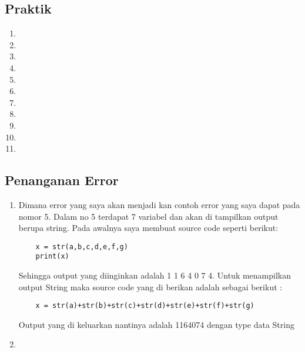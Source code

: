 \subsection{Praktik}
	\begin{enumerate}
	\item 
	
	\item
	
	\item
	
	\item
	
	\item
	
	\item
	
	\item
	
	\item
	
	\item
	
	\item
	
	\item
	
	\end{enumerate}

\subsection{Penanganan Error}
	\begin{enumerate}
	\item
	\subitem
	Dimana error yang saya akan menjadi kan contoh error yang saya dapat pada nomor 5. Dalam no 5 terdapat 7 variabel dan akan di tampilkan output berupa string. Pada awalnya saya membuat source code seperti berikut:
	\begin{verbatim}
	x = str(a,b,c,d,e,f,g)
	print(x)
	\end{verbatim}
	Sehingga output yang diinginkan adalah 1 1 6 4 0 7 4. Untuk menampilkan output String maka source code yang di berikan adalah sebagai berikut :
	\begin{verbatim}
	x = str(a)+str(b)+str(c)+str(d)+str(e)+str(f)+str(g)
	\end{verbatim}
	Output yang di keluarkan nantinya adalah 1164074 dengan type data String

	\item
	
	\end{enumerate}


	
